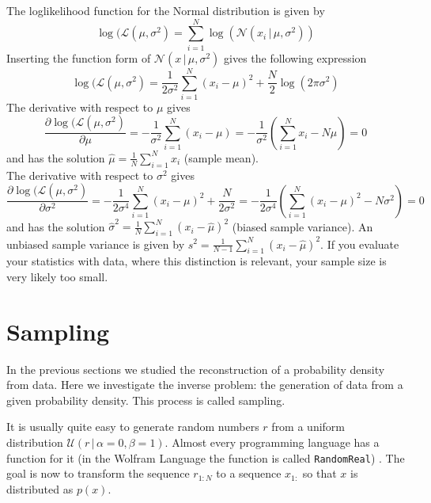 \documentclass{tstextbook}
\begin{document}
\begin{example}
The loglikelihood function for the Normal distribution is given by
  \begin{equation}
    \log(\mathcal{L}(\mu,\sigma^2) = \sum_{i=1}^N \log\left(\mathcal{N}\left(x_i\,\vert\, \mu,\sigma^2\right)\right)
  \end{equation}
Inserting the function form of $\mathcal{N}\left(x\,\vert\, \mu,\sigma^2\right)$ gives the following expression
  \begin{equation}
    \log(\mathcal{L}(\mu,\sigma^2) = \frac{1}{2\sigma^2}\sum_{i=1}^N \left(x_i-\mu\right)^2+\frac{N}{2}\log\left(2\pi\sigma^2\right)
  \end{equation}   
The derivative with respect to $\mu$ gives
  \begin{equation}
    \frac{\partial\log(\mathcal{L}(\mu,\sigma^2)}{\partial\mu} = -\frac{1}{\sigma^2}\sum_{i=1}^N \left(x_i-\mu\right)= -\frac{1}{\sigma^2}\left(\sum_{i=1}^N x_i - N\mu\right)=0
  \end{equation}
and has the solution $\hat{\mu}=\frac{1}{N}\sum_{i=1}^N x_i$ (sample mean).\\

The derivative with respect to $\sigma^2$ gives
  \begin{equation}
    \frac{\partial\log(\mathcal{L}(\mu,\sigma^2)}{\partial\sigma^2} = -\frac{1}{2\sigma^4}\sum_{i=1}^N \left(x_i-\mu\right)^2 + \frac{N}{2\sigma^2}=-\frac{1}{2\sigma^4}\left(\sum_{i=1}^N \left(x_i-\mu\right)^2 - N\sigma^2\right)=0
  \end{equation}
and has the solution $\hat{\sigma}^2=\frac{1}{N}\sum_{i=1}^N \left(x_i-\hat{\mu}\right)^2$ (biased sample variance). An unbiased sample variance is given by $s^2=\frac{1}{N-1}\sum_{i=1}^N \left(x_i-\hat{\mu}\right)^2$. If you evaluate your statistics with data, where this distinction is relevant, your sample size is very likely too small.
 
\end{example} 

\section{Sampling}
In the previous sections we studied the reconstruction of a probability density from data. Here we investigate the inverse problem: the generation of data from a given probability density. This process is called sampling.

It is usually quite easy to generate random numbers $r$ from a uniform distribution $\mathcal{U}(r\,\vert\,\alpha=0,\beta=1)$. Almost every programming language has a function for it (in the Wolfram Language the function is called \texttt{RandomReal}) . The goal is now to transform the sequence $r_{1:N}$ to a sequence $x_{1:}$ so that $x$ is distributed as $p(x)$.
\end{document}
